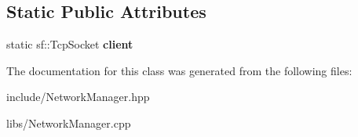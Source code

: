 \subsection*{Static Public Attributes}
\begin{DoxyCompactItemize}
\item 
\mbox{\label{classcp_1_1_network_manager_a4849a4d219dd3dddc2311e3eced9497d}} 
static sf\+::\+Tcp\+Socket {\bfseries client}
\end{DoxyCompactItemize}


The documentation for this class was generated from the following files\+:\begin{DoxyCompactItemize}
\item 
include/Network\+Manager.\+hpp\item 
libs/Network\+Manager.\+cpp\end{DoxyCompactItemize}
